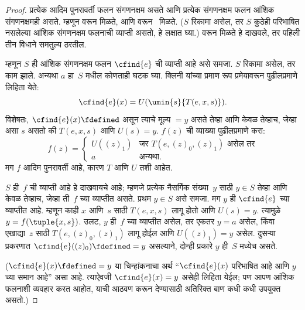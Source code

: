 \documentclass[../../../include/open-logic-section]{subfiles}
\begin{document}
\begin{proof}
प्रत्येक आदिम पुनरावर्ती फलन संगणनक्षम असते आणि प्रत्येक
संगणनक्षम फलन आंशिक संगणनक्षमही असते. म्हणून
 वरून  मिळते, आणि
 वरून~ मिळते.
($S$ रिकामा असेल, तर $S$ कुठेही परिभाषित नसलेल्या आंशिक
संगणनक्षम फलनाची व्याप्ती असतो, हे लक्षात घ्या.)
 वरून  मिळते हे
दाखवले, तर पहिली तीन विधाने समतुल्य ठरतील.

म्हणून $S$ ही आंशिक संगणनक्षम फलन $\cfind{e}$ ची व्याप्ती आहे
असे समजा. $S$ रिकामा असेल, तर काम झाले. अन्यथा $a$ हा~$S$
मधील कोणताही घटक घ्या. क्लिनी यांच्या प्रमाण रूप प्रमेयावरून
पुढीलप्रमाणे लिहिता येते:
\[
\cfind{e}(x) = U(\umin{s}{T(e, x, s)}).
\]
विशेषतः, $\cfind{e}(x) \fdefined$ असून त्याचे मूल्य $= y$ असते तेव्हा
आणि केवळ तेव्हाच, जेव्हा असा $s$ असतो की $T(e, x, s)$ आणि $U(s) = y$.
$f(z)$ ची व्याख्या पुढीलप्रमाणे करा:
\[
f(z) = \begin{cases}
  U((z)_1) & \text{जर $T(e, (z)_0, (z)_1)$ असेल तर} \\
  a        & \text{अन्यथा.}
\end{cases}
\]
मग $f$ आदिम पुनरावर्ती आहे, कारण $T$ आणि $U$
तशी आहेत. 

$S$ ही~$f$ ची व्याप्ती आहे हे दाखवायचे आहे; म्हणजे प्रत्येक
नैसर्गिक संख्या~$y$ साठी $y \in S$ तेव्हा आणि केवळ तेव्हाच, जेव्हा
ती~$f$ च्या व्याप्तीत असते. प्रथम $y \in S$ असे समजा. मग $y$ ही
$\cfind{e}$ च्या व्याप्तीत आहे. म्हणून काही $x$ आणि~$s$
साठी $T(e,x,s)$ लागू होतो आणि $U(s) = y$. त्यामुळे
$y = f(\tuple{x,s})$. उलट, $y$ ही~$f$ च्या व्याप्तीत
असेल, तर एकतर $y = a$ असेल, किंवा एखाद्या~$z$ साठी
$T(e,(z)_0,(z)_1)$ लागू होईल आणि $U((z)_1) = y$ असेल.
दुसऱ्या प्रकरणात $\cfind{e}((z)_0) \fdefined =
y$ असल्याने, दोन्ही प्रकारे $y$ ही~$S$ मध्येच असते.

($\cfind{e}(x) \fdefined = y$ या चिन्हांकनाचा अर्थ
``$\cfind{e}(x)$ परिभाषित आहे आणि $y$ च्या समान आहे'' असा आहे.
त्याऐवजी $\cfind{e}(x) =
y$ असेही लिहिता येईल; पण आपण आंशिक फलनाशी व्यवहार करत आहोत,
याची आठवण करून देण्यासाठी अतिरिक्त बाण कधी कधी उपयुक्त असतो.)


\end{proof}
\end{document}
